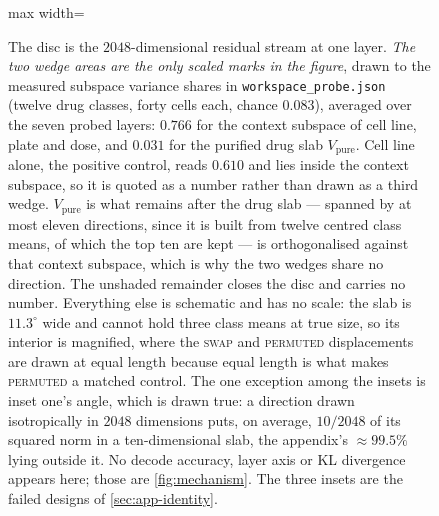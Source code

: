 \begin{figure}[htbp]
\begin{fullwidth}
\begin{adjustbox}{max width=\linewidth}
\end{adjustbox}

\caption[The drug slab and the context subspace, by variance
share]{ The disc is the
$2048$-dimensional residual stream at one layer. \emph{The two wedge areas are
the only scaled marks in the figure}, drawn to the measured subspace variance
shares in \texttt{workspace\_probe.json} (twelve drug classes, forty cells
each, chance $0.083$), averaged over the seven probed layers: $0.766$ for the
context subspace of cell line, plate and dose, and $0.031$ for the purified
drug slab $V_{\mathrm{pure}}$. Cell line alone, the positive control, reads
$0.610$ and lies inside the context subspace, so it is quoted as a number
rather than drawn as a third wedge. $V_{\mathrm{pure}}$ is what remains after
the drug slab --- spanned by at most eleven directions, since it is built from
twelve centred class means, of which the top ten are kept --- is orthogonalised
against that context subspace, which is why the two wedges share no direction.
The unshaded remainder closes the disc and carries no number. Everything else
is schematic and has no scale: the slab is $11.3^{\circ}$ wide and cannot hold
three class means at true size, so its interior is magnified, where the
\textsc{swap} and \textsc{permuted} displacements are drawn at equal length
because equal length is what makes \textsc{permuted} a matched control. The one
exception among the insets is inset one's angle, which is drawn true: a
direction drawn isotropically in $2048$ dimensions puts, on average, $10/2048$
of its squared norm in a ten-dimensional slab, the appendix's $\approx 99.5\%$
lying outside it. No decode accuracy, layer axis or KL divergence appears here;
those are \cref{fig:mechanism}. The three insets are the failed designs of
\cref{sec:app-identity}.}
\label{fig:slab}
\end{fullwidth}
\end{figure}


